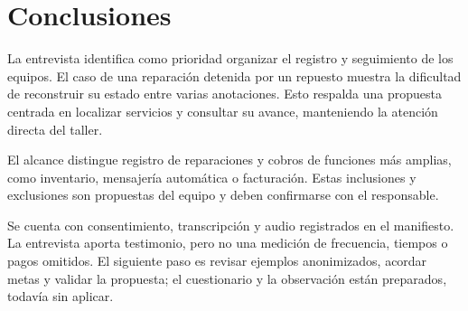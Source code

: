 \section{Conclusiones}\label{sec:conclusiones}

La entrevista identifica como prioridad organizar el registro y seguimiento de los equipos.
El caso de una reparación detenida por un repuesto muestra la dificultad de reconstruir su
estado entre varias anotaciones. Esto respalda una propuesta centrada en localizar servicios
y consultar su avance, manteniendo la atención directa del taller.

El alcance distingue registro de reparaciones y cobros de funciones más amplias, como inventario,
mensajería automática o facturación. Estas inclusiones y exclusiones son propuestas del equipo
y deben confirmarse con el responsable.

Se cuenta con consentimiento, transcripción y audio registrados en el manifiesto. La entrevista
aporta testimonio, pero no una medición de frecuencia, tiempos o pagos omitidos. El siguiente
paso es revisar ejemplos anonimizados, acordar metas y validar la propuesta; el cuestionario y
la observación están preparados, todavía sin aplicar.
